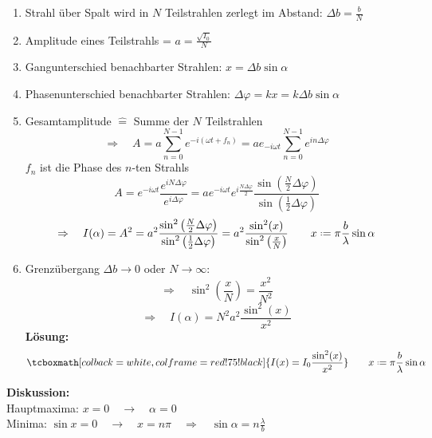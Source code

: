 \documentclass[titlepage,11pt,a4paper,ngerman]{report}
\newcommand*{\defeq}{\mathrel{\vcenter{\baselineskip0.5ex \lineskiplimit0pt \hbox{\scriptsize.}\hbox{\scriptsize.}}}=}
\newcommand{\rmbox}[1]{\tcboxmath[colback=white,colframe=red!75!black]{#1}}
\begin{document}
\begin{enumerate}[(1)]
	\item Strahl über Spalt wird in $ N $ Teilstrahlen zerlegt im Abstand: $ \Delta b = \frac{b}{N} $
	\item Amplitude eines Teilstrahls = $ a = \frac{\sqrt{I_0}}{N} $
	\item Gangunterschied benachbarter Strahlen: $ x = \Delta b \sin \alpha $
	\item Phasenunterschied benachbarter Strahlen: $ \Delta \varphi = k x = k \Delta b \sin \alpha  $
	\item Gesamtamplitude $ \widehat{=} $ Summe der $ N $ Teilstrahlen
	\begin{equation*}
	\Rightarrow \quad A = a \sum_{n=0}^{N-1} e^{-i(\omega t + f_n)} = a e_{-i \omega t} \sum_{n=0}^{N-1} e^{i n \Delta \varphi}
	\end{equation*}
	$ f_n $ ist die Phase des $ n $-ten Strahls
	\begin{equation*}
	A = e^{-i\omega t} \frac{e^{i N \Delta \varphi}}{e^{i \Delta \varphi}} = a e^{- i \omega t} e^{i \frac{N \Delta \varphi}{2}} \frac{\sin\left(\frac{N}{2} \Delta \varphi\right)}{\sin\left(\frac{1}{2} \Delta \varphi\right)}
	\end{equation*}
	\begin{equation*}
	\Rightarrow \quad I(\alpha) = A^2 = a^2 \frac{\sin^2\left(\frac{N}{2} \Delta \varphi \right)}{\sin^2 \left(\frac{1}{2} \Delta \varphi \right)} = a^2 \frac{\sin^2 (x)}{\sin^2 \left(\frac{x}{N}\right)} \qquad x \defeq \pi \frac{b}{\lambda} \sin \alpha
	\end{equation*}
	\item Grenzübergang $ \Delta b \rightarrow 0 $ oder $ N \rightarrow \infty $:
	\begin{equation*}
	\Rightarrow \quad \sin^2(\frac{x}{N}) = \frac{x^2}{N^2}
	\end{equation*}
	\begin{equation*}
	\Rightarrow \quad I(\alpha)  = N^2 a^2 \frac{\sin^2(x)}{x^2}
	\end{equation*}
	\textbf{Lösung:}
	\begin{equation*}
	\rmbox{I(x) = I_0 \frac{\sin^2(x)}{x^2}} \qquad x \defeq \pi \frac{b}{\lambda} \sin \alpha
	\end{equation*}
\end{enumerate}
\textbf{Diskussion:}\\[5pt]
Hauptmaxima: $ x = 0 \quad \rightarrow \quad \alpha = 0 $\\
Minima: $ \sin x = 0 \quad \rightarrow \quad x = n \pi \quad \Rightarrow \quad \sin \alpha = n \frac{\lambda}{b} $\\
\end{document}
